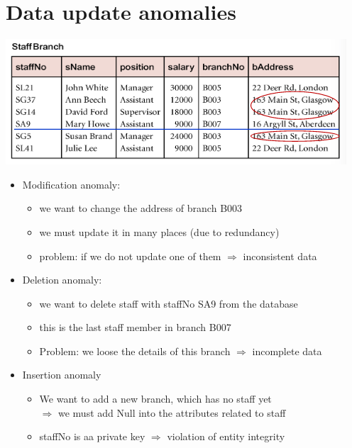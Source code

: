 \documentclass{article}[18pt]
\begin{document}
\section{Data update anomalies}
\begin{center}
	\includegraphics[scale=0.7]{anomalies}
\end{center}
\begin{itemize}
	\item Modification anomaly:
	\begin{itemize}
		\item we want to change the address of branch B003
		\item we must update it in many places (due to redundancy)
		\item problem: if we do not update one of them $\Rightarrow$ inconsistent data
	\end{itemize}
	\item Deletion anomaly:
	\begin{itemize}
		\item we want to delete staff with staffNo SA9 from the database
		\item this is the last staff member in branch B007
		\item Problem: we loose the details of this branch $\Rightarrow$ incomplete data
	\end{itemize}
	\item Insertion anomaly
	\begin{itemize}
		\item We want to add a new branch, which has no staff yet\\
	$\Rightarrow$ we must add Null into the attributes related to staff
		\item staffNo is aa private key $\Rightarrow$ violation of entity integrity
	\end{itemize}
\end{itemize}
\end{document}
